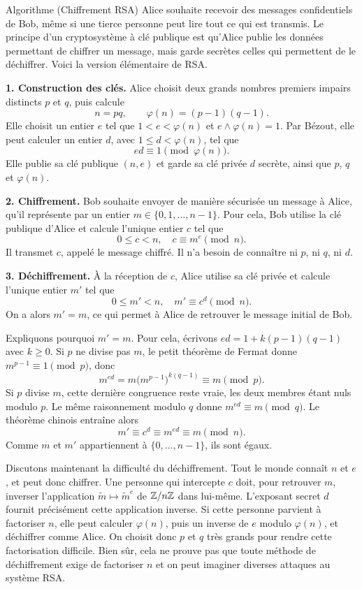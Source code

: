 \documentclass[]{report}
\begin{document}
\begin{re}{Algorithme (Chiffrement RSA)}{}
    Alice souhaite recevoir des messages confidentiels de Bob, même si une tierce personne peut lire tout ce qui est transmis. Le principe d'un cryptosystème à clé publique est qu'Alice publie les données permettant de chiffrer un message, mais garde secrètes celles qui permettent de le déchiffrer. Voici la version élémentaire de RSA.

    \textbf{1. Construction des clés.} Alice choisit deux grands nombres premiers impairs distincts $p$ et $q$, puis calcule
    \[n = pq, \qquad \varphi(n) = (p - 1)(q - 1).\]
    Elle choisit un entier $e$ tel que $1 < e < \varphi(n)$ et $e \wedge \varphi(n) = 1$. Par Bézout, elle peut calculer un entier $d$, avec $1 \le d < \varphi(n)$, tel que
    \[ed \equiv 1 \pmod{\varphi(n)}.\]
    Elle publie sa clé publique $(n, e)$ et garde sa clé privée $d$ secrète, ainsi que $p$, $q$ et $\varphi(n)$.

    \textbf{2. Chiffrement.} Bob souhaite envoyer de manière sécurisée un message à Alice, qu'il représente par un entier $m \in \{0, 1, \ldots, n-1\}$. Pour cela, Bob utilise la clé publique d'Alice et calcule l'unique entier $c$ tel que
    \[0 \le c < n, \quad c \equiv m^e \pmod{n}.\]
    Il transmet $c$, appelé le message chiffré. Il n'a besoin de connaître ni $p$, ni $q$, ni $d$.

    \textbf{3. Déchiffrement.} À la réception de $c$, Alice utilise sa clé privée et calcule l'unique entier $m'$ tel que
    \[0 \le m' < n, \quad m' \equiv c^d \pmod{n}.\]
    On a alors $m' = m$, ce qui permet à Alice de retrouver le message initial de Bob.

    Expliquons pourquoi $m' = m$. Pour cela, écrivons $ed = 1 + k(p - 1)(q - 1)$ avec $k \ge 0$. Si $p$ ne divise pas $m$, le petit théorème de Fermat donne $m^{p-1} \equiv 1 \pmod{p}$, donc
    \[m^{ed} = m \big(m^{p-1}\big)^{k(q-1)} \equiv m \pmod{p}.\]
    Si $p$ divise $m$, cette dernière congruence reste vraie, les deux membres étant nuls modulo $p$. Le même raisonnement modulo $q$ donne $m^{ed} \equiv m \pmod{q}$. Le théorème chinois entraîne alors
    \[m' \equiv c^d \equiv m^{ed} \equiv m \pmod{n}.\]
    Comme $m$ et $m'$ appartiennent à $\{0, \ldots, n-1\}$, ils sont égaux.

    Discutons maintenant la difficulté du déchiffrement. Tout le monde connaît $n$ et $e$, et peut donc chiffrer. Une personne qui intercepte $c$ doit, pour retrouver $m$, inverser l'application $\tilde{m} \mapsto \tilde{m}^e$ de $\mathbb{Z}/n\mathbb{Z}$ dans lui-même. L'exposant secret $d$ fournit précisément cette application inverse. Si cette personne parvient à factoriser $n$, elle peut calculer $\varphi(n)$, puis un inverse de $e$ modulo $\varphi(n)$, et déchiffrer comme Alice. On choisit donc $p$ et $q$ très grands pour rendre cette factorisation difficile. Bien sûr, cela ne prouve pas que toute méthode de déchiffrement exige de factoriser $n$ et on peut imaginer diverses attaques au système RSA.
\end{re}
\end{document}
